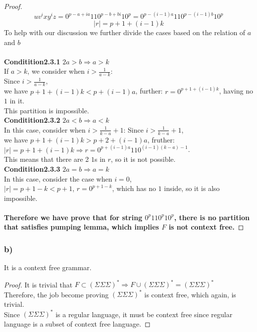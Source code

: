 \documentclass{article}
\begin{document}
\begin{proof}
				$$uv^ixy^iz = 0^{p-a+ia}110^{p-b+bi}10^{p} = 0^{p-(i-1)a}110^{p-(i-1)b}10^{p}$$
				$$|r| = p+1+(i-1)k$$
				To help with our discussion we further divide the cases based on the relation of $a$ and $b$\\
			\\
			\textbf{Conditition2.3.1} $2a > b \Rightarrow a > k$ \\
				If $a>k$, we consider when $i > \frac{1}{a-k}$: \\
				Since $i > \frac{1}{a-k}$, \\
				we have $p+1+(i-1)k < p+(i-1)a$, further:
				$r = 0^{p+1+(i-1)k}$, having no $1$ in it. \\
				This partition is impossible. 
			\\
			\textbf{Conditition2.3.2} $2a < b \Rightarrow a < k$ \\
				In this case, consider when $i > \frac{1}{k-a} + 1$:
				Since $i > \frac{1}{k-a} + 1$, \\
				we have $p+1+(i-1)k > p+2+(i-1)a$, fruther: 
				$|r| = p+1+(i-1)k \Rightarrow r = 0^{p+(i-1)a}110^{(i-1)(k-a)-1}$.\\
				This means that there are 2 $1$s in $r$, so it is not possible. \\
			\textbf{Conditition2.3.3} $2a = b \Rightarrow a = k$ \\
				In this case, consider the case when $i = 0$, \\
				$|r| = p+1-k < p + 1$, $r = 0^{p+1-k}$, which has no $1$ inside, so it is also impossible.
		\\ \\
		\textbf{Therefore we have prove that for string $0^{p}110^{p}10^{p}$, there is no partition that satisfies pumping lemma, which implies $F$ is not context free.}

	\end{proof}

\subsubsection{b)}
	It is a context free grammar.
	\begin{proof}
		It is trivial that $F \subset (\Sigma\Sigma\Sigma)^* \Rightarrow F \cup (\Sigma \Sigma \Sigma)^* = (\Sigma \Sigma \Sigma)^*$ \\
		Therefore, the job become proving $(\Sigma \Sigma \Sigma)^*$ is context free, which again, is trivial.\\
		Since $(\Sigma \Sigma \Sigma)^*$ is a regular language, it must be context free since regular language is a subset of context free language.
	\end{proof}
\end{document}
